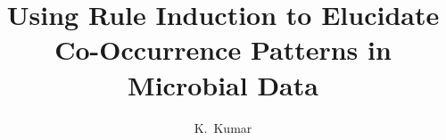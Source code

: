 \documentclass[defaultstyle,12pt]{thesis}
\title{Using Rule Induction to Elucidate Co-Occurrence Patterns in Microbial
Data}
\author{K.~Kumar}{Thurimella}
\begin{document}




\nocite{*}		%


\appendix


\end{document}
